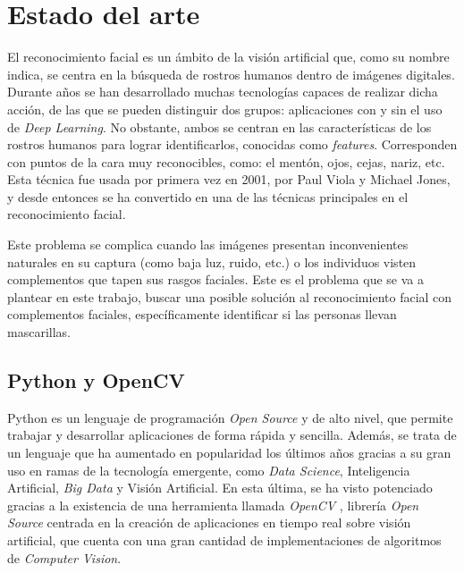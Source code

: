 
\chapter{Estado del arte}

\vspace{-1cm}
El reconocimiento facial es un ámbito de la visión artificial que, como su nombre indica, se centra en la búsqueda de rostros humanos dentro de imágenes digitales. Durante años se han desarrollado muchas tecnologías capaces de realizar dicha acción, de las que se pueden distinguir dos grupos: aplicaciones con y sin el uso de \textit{Deep Learning}. No obstante, ambos se centran en las características de los rostros humanos para lograr identificarlos, conocidas como \textit{features}. Corresponden con puntos de la cara muy reconocibles, como: el mentón, ojos, cejas, nariz, etc. Esta técnica fue usada por primera vez en 2001, por Paul Viola y Michael Jones, y desde entonces se ha convertido en una de las técnicas principales en el reconocimiento facial.

Este problema se complica cuando las imágenes presentan inconvenientes naturales en su captura (como baja luz, ruido, etc.) o los individuos visten complementos que tapen sus rasgos faciales. Este es el problema que se va a plantear en este trabajo, buscar una posible solución al reconocimiento facial con complementos faciales, específicamente identificar si las personas llevan mascarillas.

\vspace{-0.7cm}
\section{Python y OpenCV}
\vspace{-0.5cm}

Python es un lenguaje de programación \textit{Open Source} y de alto nivel, que permite trabajar y desarrollar aplicaciones de forma rápida y sencilla. Además, se trata de un lenguaje que ha aumentado en popularidad los últimos años gracias a su gran uso en ramas de la tecnología emergente, como \textit{Data Science}, Inteligencia Artificial, \textit{Big Data} y Visión Artificial. En esta última, se ha visto potenciado gracias a la existencia de una herramienta llamada \textit{OpenCV} \cite{opencv}, librería \textit{Open Source} centrada en la creación de aplicaciones en tiempo real sobre visión artificial, que cuenta con una gran cantidad de implementaciones de algoritmos de \textit{Computer Vision}.

